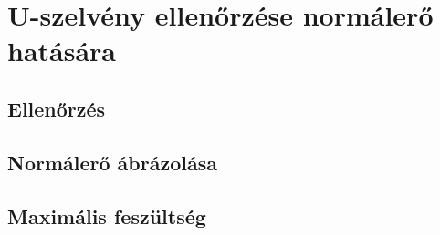 \section{U-szelvény ellenőrzése normálerő hatására}

\subsection{Ellenőrzés}

\subsection{Normálerő ábrázolása}

\subsection{Maximális feszültség}
